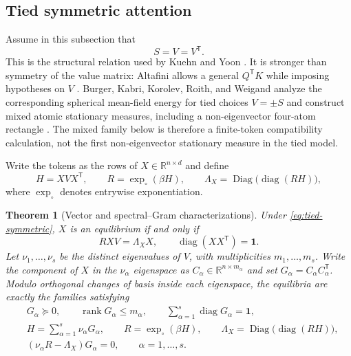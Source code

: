 \documentclass[11pt,a4paper]{article}
\newtheorem{theorem}{Theorem}[section]
\theoremstyle{definition}
\newcommand{\R}{\mathbb R}
\newcommand{\T}{\mathsf T}
\newcommand{\one}{\bm 1}
\newcommand{\diag}{\operatorname{diag}}
\newcommand{\Diag}{\operatorname{Diag}}
\newcommand{\rank}{\operatorname{rank}}
\begin{document}
\subsection{Tied symmetric attention}

Assume in this subsection that
\begin{equation}
 S=V=V^{\T}.
 \label{eq:tied-symmetric}
\end{equation}
This is the structural relation used by Kuehn and Yoon
\cite{kuehnyoon2026spectral}.  It is stronger than symmetry of the value matrix:
Altafini allows a general $Q^{\T}K$ while imposing hypotheses on $V$
\cite{altafini2025multistability}.
Burger, Kabri, Korolev, Roith, and Weigand analyze the corresponding spherical
mean-field energy for tied choices $V=\pm S$ and construct mixed atomic stationary
measures, including a non-eigenvector four-atom rectangle
\cite{burger2025layernorm}.  The mixed family below is therefore a finite-token
compatibility calculation, not the first non-eigenvector stationary measure in the
tied model.

Write the tokens as the rows of $X\in\R^{n\times d}$ and define
\begin{equation}
 H=XVX^{\T},\qquad R=\exp_{\circ}(\beta H),\qquad
 \Lambda_X=\Diag\!\bigl(\diag(RH)\bigr),
 \label{eq:spectral-objects}
\end{equation}
where $\exp_{\circ}$ denotes entrywise exponentiation.

\begin{theorem}[Vector and spectral--Gram characterizations]
\label{thm:spectral-gram}
Under \eqref{eq:tied-symmetric}, $X$ is an equilibrium if and only if
\begin{equation}
 RXV=\Lambda_X X,\qquad \diag(XX^{\T})=\one.
 \label{eq:matrix-equilibrium}
\end{equation}
Let $\nu_1,\ldots,\nu_s$ be the distinct eigenvalues of $V$, with multiplicities
$m_1,\ldots,m_s$.  Write the component of $X$ in the $\nu_\alpha$ eigenspace as
$C_\alpha\in\R^{n\times m_\alpha}$ and set
$G_\alpha=C_\alpha C_\alpha^{\T}$.  Modulo orthogonal changes of basis inside each
eigenspace, the equilibria are exactly the families satisfying
\begin{align}
 &G_\alpha\succeq0,\qquad \rank G_\alpha\le m_\alpha,
 \qquad \sum_{\alpha=1}^s\diag G_\alpha=\one,
 \label{eq:gram-feasibility}\\
 &H=\sum_{\alpha=1}^s\nu_\alpha G_\alpha,\qquad
 R=\exp_\circ(\beta H),\qquad
 \Lambda_X=\Diag\!\bigl(\diag(RH)\bigr),
 \label{eq:gram-fields}\\
 &(\nu_\alpha R-\Lambda_X)G_\alpha=0,\qquad \alpha=1,\ldots,s.
 \label{eq:gram-stationarity}
\end{align}
\end{theorem}
\end{document}
